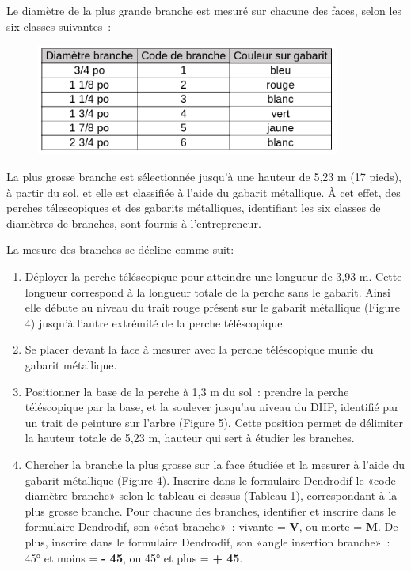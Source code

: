 \documentclass[letterpaper, 12pt]{article}
\begin{document}
\begin{onehalfspace}
\vspace{12pt}

Le diamètre de la plus grande branche est mesuré sur chacune des faces, selon les six classes suivantes :

\begin{figure}[H]
	\centering
	\includegraphics[width=10cm]{Code}
\end{figure}

\vspace{12pt}

La plus grosse branche est sélectionnée jusqu’à une hauteur de 5,23 m (17 pieds), à partir du sol, et elle est classifiée à l’aide du gabarit métallique. À cet effet, des perches télescopiques et des gabarits métalliques, identifiant les six classes de diamètres de branches, sont fournis à l’entrepreneur.

\vspace{12pt}

La mesure des branches se décline comme suit:

\begin{enumerate}
	
\item Déployer la perche téléscopique pour atteindre une longueur de 3,93 m. Cette longueur correspond à la longueur totale de la perche sans le gabarit. Ainsi elle débute au niveau du trait rouge présent sur le gabarit métallique (Figure 4) jusqu'à l'autre extrémité de la perche téléscopique.

\item Se placer devant la face à mesurer avec la perche téléscopique munie du gabarit métallique.

\item Positionner la base de la perche à  1,3 m du sol : prendre la perche téléscopique par la base, et la soulever jusqu'au niveau du DHP, identifié par un trait de peinture sur l'arbre (Figure 5). Cette position permet de délimiter la hauteur totale de 5,23 m, hauteur qui sert à étudier les branches.

\item Chercher la branche la plus grosse sur la face étudiée et la mesurer à l’aide du gabarit métallique (Figure 4). Inscrire dans le formulaire Dendrodif le «code diamètre branche» selon le tableau ci-dessus (Tableau 1), correspondant à la plus grosse branche. Pour chacune des branches, identifier et inscrire dans le formulaire Dendrodif, son «état branche» : vivante = \textbf{V}, ou morte = \textbf{M}.  De plus, inscrire dans le formulaire Dendrodif, son «angle insertion branche» : 45° et moins = \textbf{- 45}, ou 45° et plus = \textbf{+ 45}.


\end{enumerate}
\end{onehalfspace}
\end{document}
